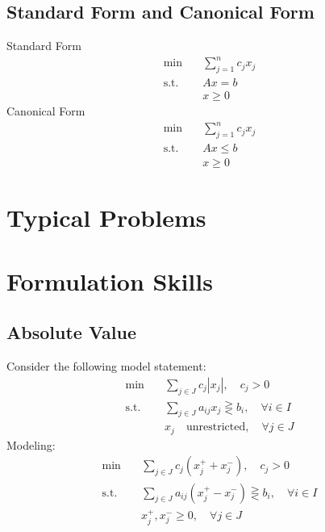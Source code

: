 			\subsection{Standard Form and Canonical Form}
				Standard Form
				\begin{align}
					\min \quad & \sum_{j=1}^nc_jx_j \\
					\text{s.t.} \quad & Ax = b \\
									  & x \ge 0 
				\end{align}
				Canonical Form
				\begin{align}
					\min \quad & \sum_{j=1}^nc_jx_j \\
					\text{s.t.} \quad & Ax \le b \\
									  & x \ge 0 
				\end{align}

		\section{Typical Problems}

		\section{Formulation Skills}
			\subsection{Absolute Value}
				Consider the following model statement:
				\begin{align}
					\min \quad & \sum_{j\in J}c_j|x_j|, \quad c_j > 0 \\
					\text{s.t.} \quad & \sum_{j\in J}a_{ij}x_j \gtreqless b_i, \quad \forall i\in I \\
					                  & x_j \quad \text{unrestricted}, \quad \forall j\in J 
				\end{align}
				Modeling:
				\begin{align}
					\min \quad & \sum_{j\in J}c_j(x_j^+ + x_j^-), \quad c_j > 0 \\
					\text{s.t.} \quad & \sum_{j\in J}a_{ij}(x_j^+ - x_j^-) \gtreqless b_i, \quad \forall i\in I \\
					                  & x_j^+, x_j^- \ge 0, \quad \forall j\in J 
				\end{align}

